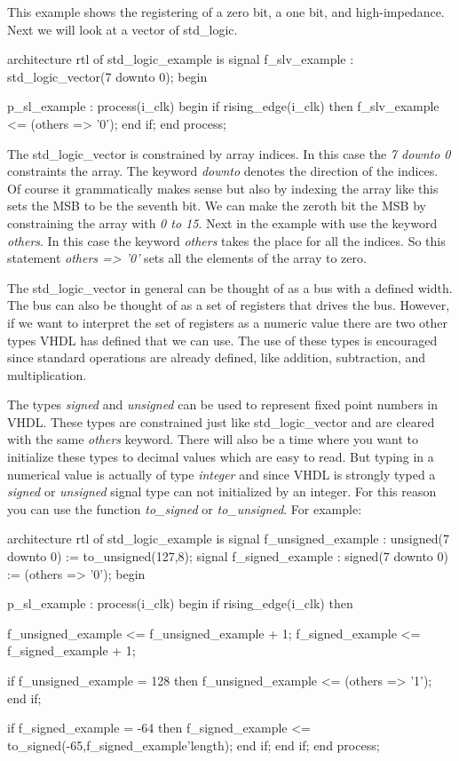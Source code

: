 This example shows the registering of a zero bit, a one bit, and high-impedance. Next we will look at a vector of std\_logic.

\begin{VHDLlisting}[tabsize=4]
architecture rtl of std_logic_example is
	signal f_slv_example  : std_logic_vector(7 downto 0);
begin

p_sl_example : process(i_clk)
begin
	if rising_edge(i_clk) then
		f_slv_example <= (others => '0');
	end if;
end process;
\end{VHDLlisting}

The std\_logic\_vector is constrained by array indices. In this case the \emph{7 downto 0} constraints the array. The keyword \emph{downto} denotes the direction of the indices. Of course it grammatically makes sense but also by indexing the array like this sets the \ac{MSB} to be the seventh bit. We can make the zeroth bit the \ac{MSB} by constraining the array with \emph{0 to 15}. Next in the example with use the keyword \emph{others}. In this case the keyword \emph{others} takes the place for all the indices. So this statement \emph{others => '0'} sets all the elements of the array to zero. 
	
The std\_logic\_vector in general can be thought of as a bus with a defined width. The bus can also be thought of as a set of registers that drives the bus. However, if we want to interpret the set of registers as a numeric value there are two other types \ac{VHDL} has defined that we can use. The use of these types is encouraged since standard operations are already defined, like addition, subtraction, and multiplication. 

The types \emph{signed} and \emph{unsigned} can be used to represent fixed point numbers in \ac{VHDL}. These types are constrained just like std\_logic\_vector and are cleared with the same \emph{others} keyword. There will also be a time where you want to initialize these types to decimal values which are easy to read. But typing in a numerical value is actually of type \emph{integer} and since \ac{VHDL} is strongly typed a \emph{signed} or \emph{unsigned} signal type can not initialized by an integer. For this reason you can use the function \emph{to\_signed} or \emph{to\_unsigned}. For example:

\begin{VHDLlisting}[tabsize=4]
architecture rtl of std_logic_example is
	signal f_unsigned_example : unsigned(7 downto 0) := to_unsigned(127,8);
	signal f_signed_example   : signed(7 downto 0)   := (others => '0');
begin

p_sl_example : process(i_clk)
begin
	if rising_edge(i_clk) then
		
		f_unsigned_example <= f_unsigned_example + 1;
		f_signed_example   <= f_signed_example   + 1;
		
		if f_unsigned_example = 128 then
			f_unsigned_example <= (others => '1');
		end if;
		
		if f_signed_example = -64 then
			f_signed_example <= to_signed(-65,f_signed_example'length);
		end if;		
	end if;
end process;
\end{VHDLlisting}

